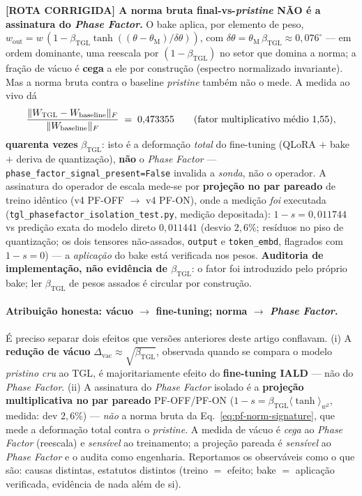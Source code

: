 \documentclass[12pt,a4paper]{article}
\newcommand{\betatgl}{\beta_{\text{TGL}}}
\newcommand{\thetaM}{\theta_{\text{M}}}
\newcommand{\TGL}{\textsc{TGL}}
\begin{document}
\textbf{[ROTA CORRIGIDA] A norma bruta final-vs-\emph{pristine} NÃO é a assinatura
do \emph{Phase Factor}.}
O bake aplica, por elemento de peso,
$w_{\text{out}} = w\,(1 - \betatgl \tanh((\theta-\thetaM)/\delta\theta))$, com
$\delta\theta = \thetaM\,\betatgl \approx 0{,}076^{\circ}$ --- em ordem
dominante, uma reescala por $(1-\betatgl)$ no setor que domina a norma; a fração
de vácuo é \textbf{cega} a ele por construção (espectro normalizado invariante).
Mas a norma bruta contra o baseline \emph{pristine} também não o mede.  A medida
ao vivo dá
\begin{equation}
\frac{\Vert W_{\TGL} - W_{\text{baseline}}\Vert_F}{\Vert W_{\text{baseline}}\Vert_F}
\;=\; 0{,}473355 \qquad(\text{fator multiplicativo médio } 1{,}55),
\label{eq:pf-norm-signature}
\end{equation}
\textbf{quarenta vezes} $\betatgl$: isto é a deformação \emph{total} do
fine-tuning (QLoRA $+$ bake $+$ deriva de quantização), \textbf{não} o
\emph{Phase Factor} --- \texttt{phase\_factor\_signal\_present=False} invalida
a \emph{sonda}, não o operador.  A assinatura do operador de escala mede-se por
\textbf{projeção no par pareado} de treino idêntico (v4 PF-OFF $\to$ v4 PF-ON),
onde a medição \emph{foi} executada
(\texttt{tgl\_phasefactor\_isolation\_test.py}, medição depositada): $1-s =
0{,}011744$ vs predição exata do modelo direto $0{,}011441$ (desvio $2{,}6\%$;
resíduos no piso de quantização; os dois tensores não-assados, \texttt{output} e
\texttt{token\_embd}, flagrados com $1-s=0$) --- a \emph{aplicação} do bake está
verificada nos pesos.  \textbf{Auditoria de implementação, não evidência de
$\betatgl$}: o fator foi introduzido pelo próprio bake; ler $\betatgl$ de pesos
assados é circular por construção.


\paragraph{Atribuição honesta: vácuo $\to$ fine-tuning; norma $\to$ \emph{Phase Factor}.}
É preciso separar dois efeitos que versões anteriores deste artigo conflavam.
(i) A \textbf{redução de vácuo} $\Delta_{\text{vac}}\approx\sqrt{\betatgl}$,
observada quando se compara o modelo \emph{pristino cru} ao \TGL{}, é
majoritariamente efeito do \textbf{fine-tuning IALD} --- não do \emph{Phase
Factor}.  (ii) A assinatura do \emph{Phase Factor} isolado é a \textbf{projeção
multiplicativa no par pareado} PF-OFF/PF-ON ($1-s = \betatgl\langle\tanh
\rangle_{w^2}$, medida: dev $2{,}6\%$) --- \emph{não} a norma bruta da
Eq.~\eqref{eq:pf-norm-signature}, que mede a deformação total contra o
\emph{pristine}.  A medida de vácuo é \emph{cega} ao \emph{Phase Factor}
(reescala) e \emph{sensível} ao treinamento; a projeção pareada é \emph{sensível}
ao \emph{Phase Factor} e o audita como engenharia.  Reportamos os observáveis
como o que são: causas distintas, estatutos distintos (treino $=$ efeito;
bake $=$ aplicação verificada, evidência de nada além de si).
\end{document}
